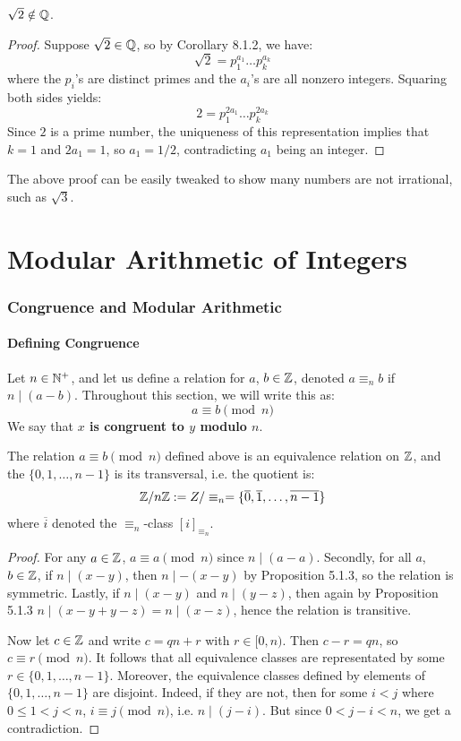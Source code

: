 \begin{propbox}
   $\sqrt{2} \notin \mathbb{Q}$. 
\end{propbox}
\begin{proof}
   Suppose $\sqrt{2} \in \mathbb{Q}$, so by Corollary 8.1.2, we have:
   \[ \sqrt{2} = p_1^{a_1}\dots p_k^{a_k} \]
   where the $p_i$'s are distinct primes and the $a_i$'s are all nonzero integers. Squaring both sides yields:
   \[ 2 = p_1^{2a_1}\dots p_k^{2a_k} \]
   Since $2$ is a prime number, the uniqueness of this representation implies that $k = 1$ and $2a_1 = 1$, so $a_1 = 1/2$, contradicting $a_1$ being an integer. 
\end{proof}
\begin{remark}
   The above proof can be easily tweaked to show many numbers are not irrational, such as $\sqrt{3}$. 
\end{remark}

\part{Modular Arithmetic of Integers}

\section{Congruence and Modular Arithmetic}

\subsection{Defining Congruence}

Let $n \in \mathbb{N}^+$, and let us define a relation for $a$, $b \in \mathbb{Z}$, denoted $a \equiv_n b$ if $n \mid (a - b)$. Throughout this section, we will write this as:
\[ a \equiv b \pmod{n} \]
We say that \textbf{$x$ is congruent to $y$ modulo $n$}. 

\begin{lemmabox}
   The relation $a \equiv b \pmod{n}$ defined above is an equivalence relation on $\mathbb{Z}$, and the $\{0, 1, \dots, n - 1\}$ is its transversal, i.e. the quotient is:
   \[ \mathbb{Z}/n\mathbb{Z} := Z/\equiv_n = \{\overline{0}, \overline{1}, \dots, \overline{n-1}\} \] 
   where $\overline{i}$ denoted the $\equiv_n$-class $[i]_{\equiv_n}$.
\end{lemmabox}
\begin{proof}
   For any $a \in \mathbb{Z}$, $a \equiv a \pmod{n}$ since $n \mid (a - a)$. Secondly, for all $a$, $b \in \mathbb{Z}$, if $n \mid (x - y)$, then $n \mid -(x - y)$ by Proposition 5.1.3, so the relation is symmetric. Lastly, if $n \mid (x-y)$ and $n \mid (y - z)$, then again by Proposition 5.1.3 $n \mid (x - y + y - z) = n \mid (x -z)$, hence the relation is transitive. 

   Now let $c \in \mathbb{Z}$ and write $c = qn + r$ with $r \in [0, n)$. Then $c - r = qn$, so $c \equiv r \pmod{n}$. It follows that all equivalence classes are representated by some $r \in \{0, 1, \dots, n - 1\}$. Moreover, the equivalence classes defined by elements of $\{0, 1, \dots, n - 1\}$ are disjoint. Indeed, if they are not, then for some $i < j$ where $0 \leq 1 < j < n$, $i \equiv j \pmod{n}$, i.e. $n \mid (j - i)$. But since $0 < j - i < n$, we get a contradiction. 
\end{proof}

